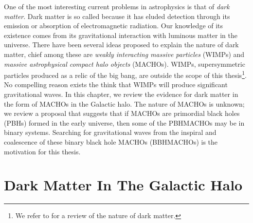 
One of the most interesting current problems in astrophysics is that of
\emph{dark matter}. Dark matter is so called because it has eluded detection
through its emission or absorption of electromagnetic radiation. Our knowledge
of its existence comes from its gravitational interaction with luminous matter
in the universe. There have been several ideas proposed to explain the nature
of dark matter, chief among these are \emph{weakly interacting massive
particles} (WIMPs) and \emph{massive astrophysical compact halo objects}
(MACHOs)\cite{Griest:1990vu}.  WIMPs, supersymmetric particles produced as a
relic of the big bang, are outside the scope of this thesis\footnote{We refer
to \cite{Griest:1995gs} for a review of the nature of dark matter.}. No
compelling reason exists the think that WIMPs will produce significant
gravitational waves. In this chapter, we review the evidence for dark matter
in the form of MACHOs in the Galactic halo. The nature of MACHOs is unknown;
we review a proposal that suggests that if MACHOs are primordial black holes
(PBHs) formed in the early universe, then some of the PBHMACHOs may be in
binary systems\cite{Nakamura:1997sm}. Searching for gravitational waves from
the inspiral and coalescence of these binary black hole MACHOs (BBHMACHOs) is
the motivation for this thesis.

\section{Dark Matter In The Galactic Halo}
\label{s:darkmatter}

